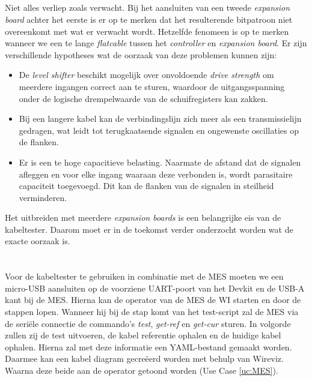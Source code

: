 \subsection{} 

Niet alles verliep zoals verwacht. Bij het aansluiten van een tweede \textit{expansion board} achter het eerste is er op te merken dat het resulterende bitpatroon niet overeenkomt met wat er verwacht wordt. Hetzelfde fenomeen is op te merken wanneer we een te lange \textit{flatcable} tussen het  \textit{controller} en \textit{expansion board}. Er zijn verschillende hypotheses wat de oorzaak van deze problemen kunnen zijn:

\begin{itemize}[]
    \item De \textit{level shifter} beschikt mogelijk over onvoldoende \textit{drive strength} om meerdere ingangen correct aan te sturen, waardoor de uitgangsspanning onder de logische drempelwaarde van de schuifregisters kan zakken.
    \item Bij een langere kabel kan de verbindingslijn zich meer als een transmissielijn gedragen, wat leidt tot terugkaatsende signalen en ongewenste oscillaties op de flanken.
    \item Er is een te hoge capacitieve belasting. Naarmate de afstand dat de signalen afleggen en voor elke ingang waaraan deze verbonden is, wordt parasitaire capaciteit toegevoegd. Dit kan de flanken van de signalen in steilheid verminderen.
\end{itemize}

Het uitbreiden met meerdere \textit{expansion boards} is een belangrijke eis van de kabeltester. Daarom moet er in de toekomst verder onderzocht worden wat de exacte oorzaak is. 

\newpage
\section{}%
\label{sec:CTMES}

\subsection{}%
\label{ssec:AnalyseMES}

Voor de kabeltester te gebruiken in combinatie met de \gls{MES} moeten we een micro-USB aansluiten op de voorziene \acrshort{UART}-poort van het Devkit en de USB-A kant bij de \gls{MES}. Hierna kan de operator van de \gls{MES} de \gls{WI} starten en door de stappen lopen. Wanneer hij bij de stap komt van het test-script zal de \gls{MES} via de seriële connectie de commando's \textit{test}, \textit{get-ref} en \textit{get-cur} sturen. In volgorde zullen zij de test uitvoeren, de kabel referentie ophalen en de huidige kabel ophalen. Hierna zal met deze informatie een \gls{YAML}-bestand gemaakt worden. Daarmee kan een kabel diagram gecreëerd worden met behulp van Wireviz. Waarna deze beide aan de operator getoond worden (Use Case \ref{uc:MES}).

